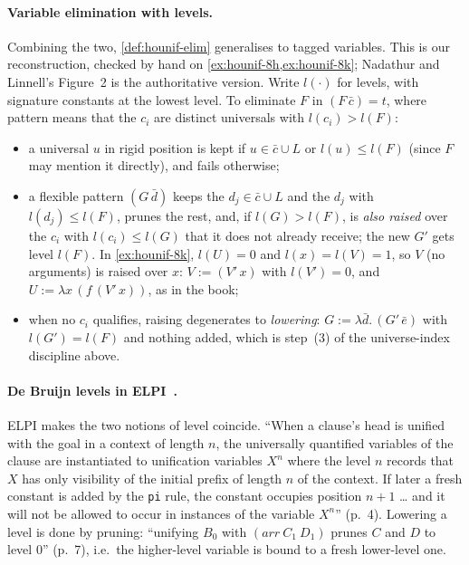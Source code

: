 \paragraph{Variable elimination with levels.} Combining the two, \cref{def:hounif-elim} generalises to tagged
variables. This is our reconstruction, checked by hand on \cref{ex:hounif-8h,ex:hounif-8k}; Nadathur and Linnell's
Figure~2 is the authoritative version. Write $l(\cdot)$ for levels, with signature constants at the lowest level.
To eliminate $F$ in $(F\,\bar c)=t$, where pattern means that the $c_i$ are distinct universals with
$l(c_i)>l(F)$:\par\endgroup
\begin{itemize}
  \item a universal $u$ in rigid position is kept if $u\in\bar c\cup L$ or $l(u)\le l(F)$ (since $F$ may mention it
    directly), and fails otherwise;
  \item a flexible pattern $(G\,\bar d)$ keeps the $d_j\in\bar c\cup L$ and the $d_j$ with $l(d_j)\le l(F)$, prunes the rest,
    and, if $l(G)>l(F)$, is \emph{also raised} over the $c_i$ with $l(c_i)\le l(G)$ that it does not already receive;
    the new $G'$ gets level $l(F)$. In \cref{ex:hounif-8k}, $l(U)=0$ and $l(x)=l(V)=1$, so $V$ (no arguments) is
    raised over $x$: $V:=(V'\,x)$ with $l(V')=0$, and $U:=\lambda x\,(f\,(V'\,x))$, as in the book;
  \item when no $c_i$ qualifies, raising degenerates to \emph{lowering}: $G:=\lambda\bar d.\,(G'\,\bar e)$ with
    $l(G')=l(F)$ and nothing added, which is step~(3) of the universe-index discipline above.
\end{itemize}

\paragraph{De Bruijn levels in ELPI~\cite{DunchevEtAl2015}.} ELPI makes the two notions of level coincide.
\enquote{When a clause's head is unified with the goal in a context of length $n$, the universally quantified variables
of the clause are instantiated to unification variables $X^n$ where the level $n$ records that $X$ has only
visibility of the initial prefix of length $n$ of the context. If later a fresh constant is added by the
\texttt{pi} rule, the constant occupies position $n+1$ \dots{} and it will not be allowed to occur in instances of the
variable $X^n$} (p.~4). Lowering a level is done by pruning: \enquote{unifying $B_0$ with $(\mathit{arr}\ C_1\ D_1)$
prunes $C$ and $D$ to level $0$} (p.~7), i.e.\ the higher-level variable is bound to a fresh lower-level one.

